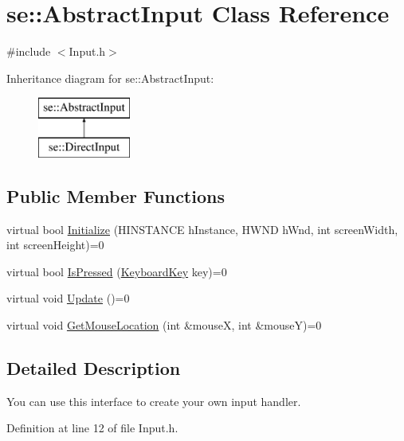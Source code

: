 \hypertarget{classse_1_1_abstract_input}{}\section{se\+:\+:Abstract\+Input Class Reference}
\label{classse_1_1_abstract_input}


{\ttfamily \#include $<$Input.\+h$>$}

Inheritance diagram for se\+:\+:Abstract\+Input\+:\begin{figure}[H]
\begin{center}
\leavevmode
\includegraphics[height=2.000000cm]{classse_1_1_abstract_input}
\end{center}
\end{figure}
\subsection*{Public Member Functions}
\begin{DoxyCompactItemize}
\item 
virtual bool \mbox{\hyperlink{classse_1_1_abstract_input_a6219cdd66247d08f3ca52b2fea305b8d}{Initialize}} (H\+I\+N\+S\+T\+A\+N\+CE h\+Instance, H\+W\+ND h\+Wnd, int screen\+Width, int screen\+Height)=0
\item 
virtual bool \mbox{\hyperlink{classse_1_1_abstract_input_a4375b92281cee63064c898a791ddd1a3}{Is\+Pressed}} (\mbox{\hyperlink{namespacese_a94221cf8f238f1eadbe3ac4b8ac7bc71}{Keyboard\+Key}} key)=0
\item 
virtual void \mbox{\hyperlink{classse_1_1_abstract_input_a7c9b63e9df453d38c035fb9fa91c0d70}{Update}} ()=0
\item 
virtual void \mbox{\hyperlink{classse_1_1_abstract_input_a93673fb3534be8bbc1f495f650064b91}{Get\+Mouse\+Location}} (int \&mouseX, int \&mouseY)=0
\end{DoxyCompactItemize}


\subsection{Detailed Description}
You can use this interface to create your own input handler. 

Definition at line 12 of file Input.\+h.



